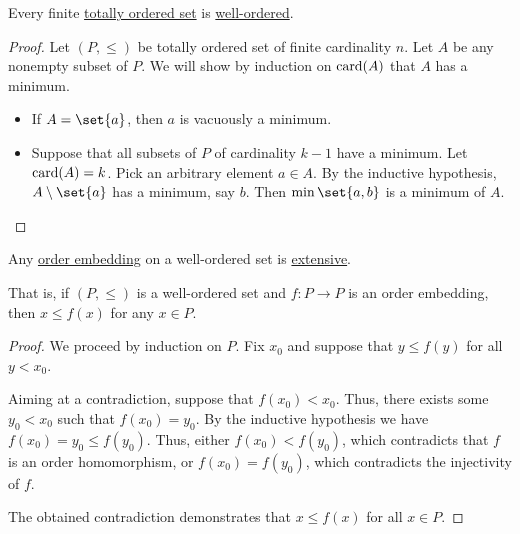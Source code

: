 \begin{proposition}\label{thm:finite_totally_ordered_set_is_well_ordered}
  Every finite \hyperref[def:totally_ordered_set]{totally ordered set} is \hyperref[def:well_ordered_set]{well-ordered}.
\end{proposition}
\begin{proof}
  Let \( (P, \leq) \) be totally ordered set of finite cardinality \( n \). Let \( A \) be any nonempty subset of \( P \). We will show by induction on \( \operatorname{card}(A) \) that \( A \) has a minimum.

  \begin{itemize}
    \item If \( A = \set{ a } \), then \( a \) is vacuously a minimum.
    \item Suppose that all subsets of \( P \) of cardinality \( k - 1 \) have a minimum. Let \( \operatorname{card}(A) = k \). Pick an arbitrary element \( a \in A \). By the inductive hypothesis, \( A \setminus \set{ a } \) has a minimum, say \( b \). Then \( \min\set{ a, b } \) is a minimum of \( A \).
  \end{itemize}
\end{proof}

\begin{lemma}\label{thm:well_ordered_embedding_extensive}
  Any \hyperref[def:order_homomorphism/embedding]{order embedding} on a well-ordered set is \hyperref[def:extensive_function]{extensive}.

  That is, if \( (P, \leq) \) is a well-ordered set and \( f: P \to P \) is an order embedding, then \( x \leq f(x) \) for any \( x \in P \).
\end{lemma}
\begin{proof}
  We proceed by induction on \( P \). Fix \( x_0 \) and suppose that \( y \leq f(y) \) for all \( y < x_0 \).

  Aiming at a contradiction, suppose that \( f(x_0) < x_0 \). Thus, there exists some \( y_0 < x_0 \) such that \( f(x_0) = y_0 \). By the inductive hypothesis we have \( f(x_0) = y_0 \leq f(y_0) \). Thus, either \( f(x_0) < f(y_0) \), which contradicts that \( f \) is an order homomorphism, or \( f(x_0) = f(y_0) \), which contradicts the injectivity of \( f \).

  The obtained contradiction demonstrates that \( x \leq f(x) \) for all \( x \in P \).
\end{proof}

